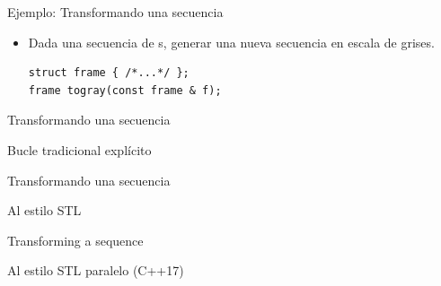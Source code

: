 \begin{frame}[t,fragile]{Ejemplo: Transformando una secuencia}
\begin{itemize}
  \item Dada una secuencia de s, generar una 
        nueva secuencia en escala de grises.
\begin{lstlisting}
struct frame { /*...*/ };
frame togray(const frame & f);
\end{lstlisting}
\end{itemize}
\begin{center}

\end{center}
\end{frame}

\begin{frame}[t,fragile]{Transformando una secuencia}
\begin{block}{Bucle tradicional explícito}

\end{block}
\end{frame}

\begin{frame}[t,fragile]{Transformando una secuencia}
\begin{block}{Al estilo STL}

\end{block}
\end{frame}

\begin{frame}[t,fragile]{Transforming a sequence}
\begin{block}{Al estilo STL paralelo (C++17)}

\end{block}
\end{frame}

